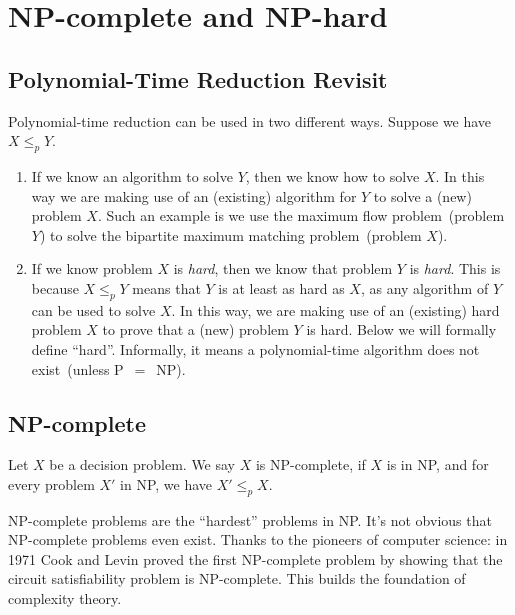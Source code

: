 \setcounter{definition}{0} \setcounter{property}{0} \setcounter{claim}{0} \setcounter{fact}{0} \setcounter{corollary}{0} \setcounter{figure}{0}
\section{NP-complete and NP-hard}

\subsection*{Polynomial-Time Reduction Revisit}

Polynomial-time reduction can be used in two different ways. Suppose we have $X\le_p Y$.
\begin{enumerate}
\item If we know an algorithm to solve $Y$, then we know how to solve $X$. In this way
we are making use of an (existing) algorithm for $Y$ to solve a (new) problem $X$. Such an example
is we use the maximum flow problem~(problem $Y$) to solve the bipartite maximum matching problem~(problem $X$).
\item If we know problem $X$ is \emph{hard}, then we know that problem $Y$ is \emph{hard}. 
This is because $X\le_p Y$ means that $Y$ is at least as hard as $X$, as any algorithm of $Y$ can be used to solve $X$.
In this way, we are making use of an (existing) hard problem $X$
to prove that a (new) problem $Y$ is hard.  Below we will formally define ``hard''.
Informally, it means a polynomial-time algorithm does not exist~(unless P{}~$=${}~NP).
\end{enumerate}


\subsection*{NP-complete}

\begin{definition}[NP-complete]
Let $X$ be a decision problem. We say $X$ is NP-complete, if $X$ is in NP, and for every problem $X'$ in NP, we have $X'\le_p X$.
\end{definition}

NP-complete problems are the ``hardest'' problems in NP. It's not obvious that
NP-complete problems even exist.  
Thanks to the pioneers of computer science: in 1971 Cook and Levin proved the first
NP-complete problem by showing that the circuit satisfiability problem is NP-complete.
This builds the foundation of complexity theory.


